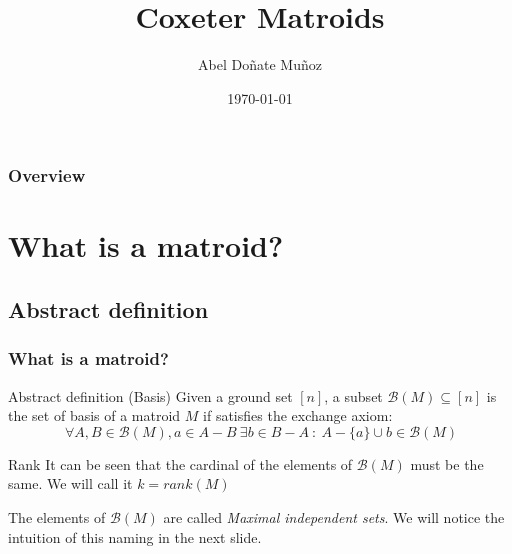 \documentclass{beamer}
\title{Coxeter Matroids} %
\author{Abel Doñate Muñoz} %
\institute[UPC] %
{
Universitat Politècnica de Catalunya \\ %
\medskip
\textit{abel.donate.munoz@gmail.com} %
}
\date{\today} %
\begin{document}
\begin{frame}
\titlepage %
\end{frame}

\begin{frame}
\frametitle{Overview} %
\tableofcontents %
\end{frame}


\section{What is a matroid?} %

\subsection{Abstract definition}

\begin{frame}
\frametitle{What is a matroid?}
\begin{block}{Abstract definition (Basis)}
  Given a ground set $[n]$, a subset $\mathcal{B}(M)\subseteq [n]$ is the set of basis of a matroid $M$ if satisfies the exchange axiom:
   \[
  \ \forall A, B \in \mathcal{B}(M), a \in A-B \ \exists b\in B-A \ : \ A-\{a\}\cup {b} \in \mathcal{B}(M)
  \] 
\end{block}
\begin{block}{Rank}
It can be seen that the cardinal of the elements of $\mathcal{B}(M)$ must be the same. We will call it $k = rank(M)$
\end{block}

The elements of  $\mathcal{B}(M)$ are called \textit{Maximal independent sets}. We will notice the intuition of this naming in the next slide.
\end{frame}
\end{document}
